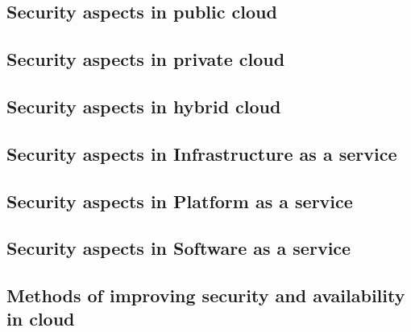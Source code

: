 \documentclass{article}
\begin{document}
\subsection{Security aspects in public cloud}
\subsection{Security aspects in private cloud}
\subsection{Security aspects in hybrid cloud}
\subsection{Security aspects in Infrastructure as a service}
\subsection{Security aspects in Platform as a service}
\subsection{Security aspects in Software as a service}
\subsection{Methods of improving security and availability in cloud}
\end{document}
